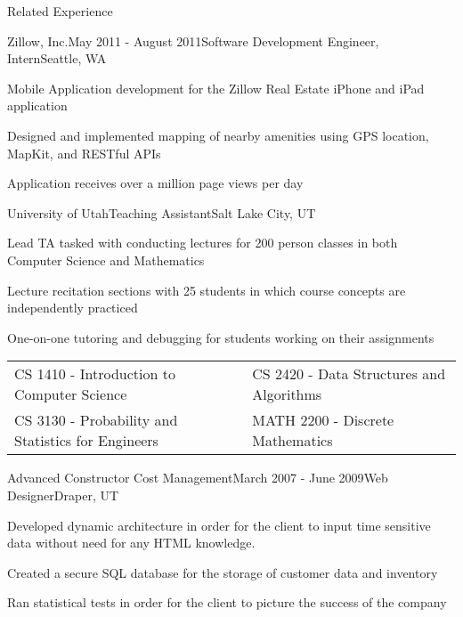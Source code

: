 \documentclass{resume}
\begin{document}
\begin{relatedExperience}
\begin{rSection}{Related Experience}

\begin{experienceZillow}
\begin{rSubsection}{Zillow, Inc.}{May 2011 - August 2011}{Software Development Engineer, Intern}{Seattle, WA}
\item Mobile Application development for the Zillow Real Estate iPhone and iPad application
\item Designed and implemented mapping of nearby amenities using GPS location, MapKit, and RESTful APIs
\item Application receives over a million page views per day
\end{rSubsection}
\end{experienceZillow}


\begin{experienceTA}
\begin{rSubsection}{University of Utah}{}{Teaching Assistant}{Salt Lake City, UT}
\item Lead TA tasked with conducting lectures for 200 person classes in both Computer Science and Mathematics
\item Lecture recitation sections with 25 students in which course concepts are independently practiced
\item One-on-one tutoring and debugging for students working on their assignments
\\
\begin{tabularx}{\textwidth}{ l l }
CS 1410 - Introduction to Computer Science & CS 2420 - Data Structures and Algorithms \\
CS 3130 - Probability and Statistics for Engineers & MATH 2200 - Discrete Mathematics \\
\end{tabularx}
\end{rSubsection}
\end{experienceTA}


\begin{experienceACCM}
\begin{rSubsection}{Advanced Constructor Cost Management}{March 2007 - June 2009}{Web Designer}{Draper, UT}
\item Developed dynamic architecture in order for the client to input time sensitive data without need for any HTML knowledge.
\item Created a secure SQL database for the storage of customer data and inventory
\item Ran statistical tests in order for the client to picture the success of the company
\end{rSubsection}
\end{experienceACCM}


\end{rSection}
\end{relatedExperience}
\end{document}

